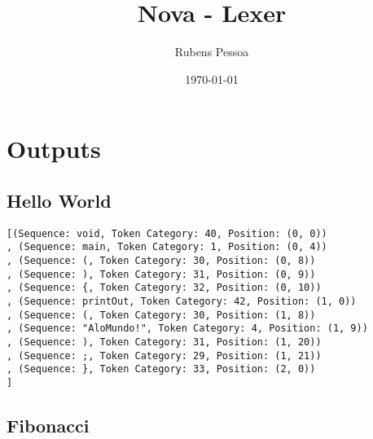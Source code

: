 \documentclass[a4paper, 12pt, article]{memoir}
\title{Nova - Lexer}
\author{Rubens Pessoa}
\date{\today}
\begin{document}
\frontmatter
\begin{titlingpage}
  \maketitle
\end{titlingpage}

\tableofcontents

\mainmatter

\section{Outputs}
\label{sec:era e lex}

\subsection{Hello World}
\begin{lstlisting}
[(Sequence: void, Token Category: 40, Position: (0, 0))
, (Sequence: main, Token Category: 1, Position: (0, 4))
, (Sequence: (, Token Category: 30, Position: (0, 8))
, (Sequence: ), Token Category: 31, Position: (0, 9))
, (Sequence: {, Token Category: 32, Position: (0, 10))
, (Sequence: printOut, Token Category: 42, Position: (1, 0))
, (Sequence: (, Token Category: 30, Position: (1, 8))
, (Sequence: "AloMundo!", Token Category: 4, Position: (1, 9))
, (Sequence: ), Token Category: 31, Position: (1, 20))
, (Sequence: ;, Token Category: 29, Position: (1, 21))
, (Sequence: }, Token Category: 33, Position: (2, 0))
]
\end{lstlisting}


\subsection{Fibonacci}
\label{subsec:fib}
\end{document}
